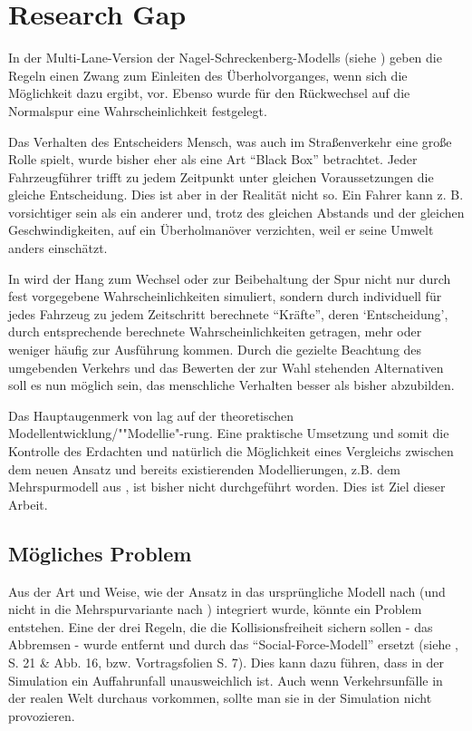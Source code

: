 \section{Research Gap}
\label{sec:researchgap}

In der Multi-Lane-Version der Nagel-Schreckenberg-Modells (siehe \cite{multi-lane}) geben die Regeln einen Zwang zum Einleiten des Überholvorganges, wenn sich die Möglichkeit dazu ergibt, vor. Ebenso wurde für den Rückwechsel auf die Normalspur eine Wahrscheinlichkeit festgelegt.

Das Verhalten des Entscheiders Mensch, was auch im Straßenverkehr eine große Rolle spielt, wurde bisher eher als eine Art \enquote{Black Box} betrachtet. 
Jeder Fahrzeugführer trifft zu jedem Zeitpunkt unter gleichen Voraussetzungen die gleiche Entscheidung. 
Dies ist aber in der Realität nicht so. 
Ein Fahrer kann z. B. vorsichtiger sein als ein anderer und, trotz des gleichen Abstands und der gleichen Geschwindigkeiten, auf ein Überholmanöver verzichten, weil er seine Umwelt anders einschätzt.

In \cite{dat-ba} wird der Hang zum Wechsel oder zur Beibehaltung der Spur nicht nur durch fest vorgegebene Wahrscheinlichkeiten simuliert, sondern durch individuell für jedes Fahrzeug zu jedem Zeitschritt berechnete \enquote{Kräfte}, deren \enquote*{Entscheidung}, durch entsprechende berechnete Wahrscheinlichkeiten getragen, mehr oder weniger häufig zur Ausführung kommen. 
Durch die gezielte Beachtung des umgebenden Verkehrs und das Bewerten der zur Wahl stehenden Alternativen soll es nun möglich sein, das menschliche Verhalten besser als bisher abzubilden.

Das Hauptaugenmerk von \cite{dat-ba} lag auf der theoretischen Modellentwicklung/""Modellie"-rung. 
Eine praktische Umsetzung und somit die Kontrolle des Erdachten und natürlich die Möglichkeit eines Vergleichs zwischen dem neuen Ansatz und bereits existierenden Modellierungen, z.B. dem Mehrspurmodell aus \cite{multi-lane}, ist bisher nicht durchgeführt worden. 
Dies ist Ziel dieser Arbeit.

\subsection*{Mögliches Problem}

Aus der Art und Weise, wie der Ansatz in das ursprüngliche Modell nach \cite{na-sch} (und nicht in die Mehrspurvariante nach \cite{multi-lane}) integriert wurde, könnte ein Problem entstehen.
Eine der drei Regeln, die die Kollisionsfreiheit sichern sollen - das Abbremsen - wurde entfernt und durch das \enquote{Social-Force-Modell} ersetzt (siehe \cite{dat-ba}, S. 21 \& Abb. 16, bzw. Vortragsfolien S. 7).
Dies kann dazu führen, dass in der Simulation ein Auffahrunfall unausweichlich ist.
Auch wenn Verkehrsunfälle in der realen Welt durchaus vorkommen, sollte man sie in der Simulation nicht provozieren.

